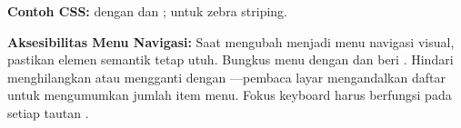 \textbf{Contoh CSS:}  dengan  dan ;  untuk zebra striping.

\begin{catatan}
\textbf{Aksesibilitas Menu Navigasi:} Saat mengubah  menjadi menu navigasi visual, pastikan elemen semantik tetap utuh. Bungkus menu dengan  dan beri . Hindari menghilangkan  atau mengganti  dengan ---pembaca layar mengandalkan daftar untuk mengumumkan jumlah item menu. Fokus keyboard harus berfungsi pada setiap tautan \cite{mdnAccessibility}.
\end{catatan}

